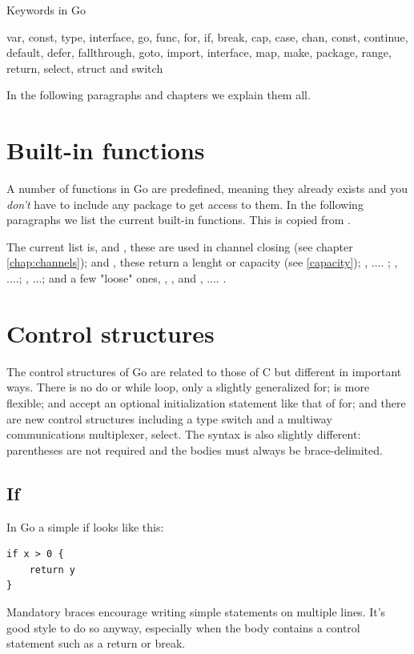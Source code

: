 \begin{table}
\caption{Keywords in Go}

\end{table}

var, const, type, interface, go, func, for, if, break, cap,
case, chan, const, continue, default, defer, fallthrough, goto,
import, interface, map, make, package, range, return, select, struct and switch

In the following paragraphs and chapters we explain them all.

\section{Built-in functions}
A number of functions in Go are predefined, meaning they already
exists and you \emph{don't} have to include any package to get
access to them. In the following paragraphs we list the current 
built-in functions. This is copied from \cite{go_spec}.

The current list is,  and , these are used in 
channel closing (see chapter \ref{chap:channels}); 
 and , these return a lenght or capacity (see \ref{capacity});
, .... ; , ....; , ...; and a few
"loose" ones, , ,  and
, .... .


\section{Control structures}
The control structures of Go are related to those of C but different in
important ways. There is no do or while loop, only a slightly
generalized for;  is more flexible;  and
 accept an
optional initialization statement like that of for; and there are new
control structures including a type switch and a multiway communications
multiplexer, select. The syntax is also slightly different: parentheses
are not required and the bodies must always be brace-delimited.

\subsection{If}
In Go a simple if looks like this:
\begin{lstlisting}
if x > 0 {
    return y
}
\end{lstlisting}
Mandatory braces encourage writing simple  statements on multiple
lines. It's good style to do so anyway, especially when the body
contains a control statement such as a return or break.

